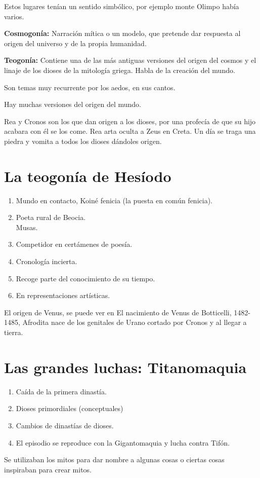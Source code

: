 Estos lugares tenían un sentido simbólico, por ejemplo monte Olimpo había varios.

\textbf{Cosmogonía:} Narración mítica o un modelo, que pretende dar respuesta al origen del universo y de la propia humanidad.

\textbf{Teogonía:} Contiene una de las más antiguas versiones del origen del cosmos y el linaje de los dioses de la mitología griega. Habla de la creación del mundo.

Son temas muy recurrente por los aedos, en sus cantos.

Hay muchas versiones del origen del mundo.

Rea y Cronos son los que dan origen a los dioses, por una profecía de que su hijo acabara con él se los come. Rea arta oculta a Zeus en Creta. Un día se traga una piedra y vomita a todos los dioses dándoles origen.

\section{La teogonía de Hesíodo}
\begin{enumerate}
	\item Mundo en contacto, Koiné fenicia (la puesta en común fenicia).
	\item Poeta rural de Beocia. \\ Musas.
	\item Competidor en certámenes de poesía.
	\item Cronología incierta.
	\item Recoge parte del conocimiento de su tiempo.
	\item En representaciones artísticas.
\end{enumerate}

El origen de Venus, se puede ver en El nacimiento de Venus de Botticelli, 1482-1485, Afrodita nace de los genitales de Urano cortado por Cronos y al llegar a tierra.

\section{Las grandes luchas: Titanomaquia}
\begin{enumerate}
	\item Caída de la primera dinastía.
	\item Dioses primordiales (conceptuales)
	\item Cambios de dinastías de dioses.
	\item El episodio se reproduce con la Gigantomaquia y lucha contra Tifón.
\end{enumerate}

Se utilizaban los mitos para dar nombre a algunas cosas o ciertas cosas inspiraban para crear mitos.
